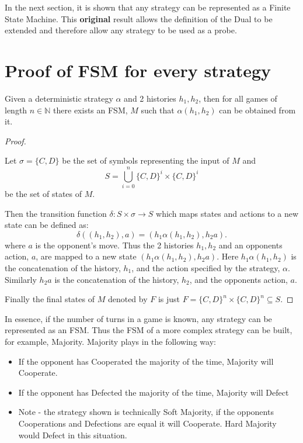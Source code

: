 In the next section, it is shown that any strategy can be represented as a Finite State Machine.
This \textbf{original} result allows the definition of the Dual to be extended and therefore allow any strategy to be used as a probe.



\section{Proof of FSM for every strategy}\label{sec:fsm_proof}
\begin{theorem}\label{thm:fsm}
Given a deterministic strategy $\alpha$ and 2 histories $h_1, h_2$, then for all games of length $n \in \mathbb{N}$ there exists an FSM, $M$ such that $\alpha(h_1, h_2)$ can be obtained from it.
\end{theorem}


\begin{proof}\label{prf:fsm}

Let $\sigma = \{C, D\}$ be the set of symbols representing the input of $M$ and
$$ S = \bigcup_{i=0}^{n} \{C, D\}^i \times \{C, D\}^i $$
be the set of states of $M$.

Then the transition function $\delta: S \times \sigma \rightarrow S$ which maps states and actions to a new state can be defined as:
$$
\delta((h_1, h_2), a) = (h_1 \alpha(h_1, h_2), h_2a).
$$
where $a$ is the opponent's move.
Thus the 2 histories $h_1, h_2$ and an opponents action, $a$, are mapped to a new state $(h_1 \alpha(h_1, h_2), h_2a)$.
Here $h_1 \alpha(h_1, h_2)$ is the concatenation of the history, $h_1$, and the action specified by the strategy, $\alpha$.
Similarly $h_2a$ is the concatenation of the history, $h_2$, and the opponents action, $a$.

Finally the final states of $M$ denoted by $F$ is just $F = \{C, D\}^{n} \times \{C, D\}^{n} \subseteq S$.

\end{proof}

In essence, if the number of turns in a game is known, any strategy can be represented as an FSM.
Thus the FSM of a more complex strategy can be built, for example, Majority.
Majority plays in the following way:

\begin{itemize}
  \item If the opponent has Cooperated the majority of the time, Majority will Cooperate.
  \item If the opponent has Defected the majority of the time, Majority will Defect
  \item Note - the strategy shown is technically Soft Majority, if the opponents Cooperations and Defections are equal it will Cooperate. Hard Majority would Defect in this situation.
\end{itemize}

